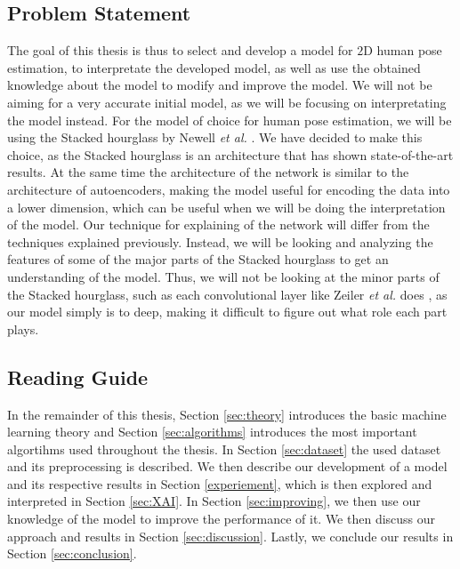 \documentclass[./main.tex]{subfiles}
\begin{document}
\subsection{Problem Statement}
The goal of this thesis is thus to select and develop a model for $2$D human pose estimation, to interpretate the developed model, as well as use the obtained knowledge about the model to modify and improve the model. We will not be aiming for a very accurate initial model, as we will be focusing on interpretating the model instead. For the model of choice for human pose estimation, we will be using the Stacked hourglass by Newell \textit{et al.} \cite{Newell}. We have decided to make this choice, as the Stacked hourglass is an architecture that has shown state-of-the-art results. At the same time the architecture of the network is similar to the architecture of autoencoders, making the model useful for encoding the data into a lower dimension, which can be useful when we will be doing the interpretation of the model. Our technique for explaining of the network will differ from the techniques explained previously. Instead, we will be looking and analyzing the features of some of the major parts of the Stacked hourglass to get an understanding of the model. Thus, we will not be looking at the minor parts of the Stacked hourglass, such as each convolutional layer like Zeiler \textit{et al.} does \cite{Zeiler}, as our model simply is to deep, making it difficult to figure out what role each part plays.

\subsection{Reading Guide}
In the remainder of this thesis, Section \ref{sec:theory} introduces the basic machine learning theory and Section \ref{sec:algorithms} introduces the most important algortihms used throughout the thesis. In Section \ref{sec:dataset} the used dataset and its preprocessing is described. We then describe our development of a model and its respective results in Section \ref{experiement}, which is then explored and interpreted in Section \ref{sec:XAI}. In Section \ref{sec:improving}, we then use our knowledge of the model to improve the performance of it. We then discuss our approach and results in Section \ref{sec:discussion}. Lastly, we conclude our results in Section \ref{sec:conclusion}.
\end{document}

